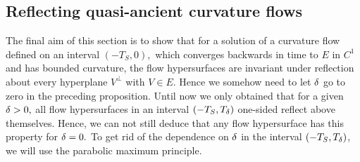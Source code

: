 \documentclass{amsart}
\begin{document}
\subsection{Reflecting quasi-ancient curvature flows}
The final aim of this section is to show that for a solution of a curvature flow defined on an interval $(-T_{S},0),$ which converges backwards in time to $E$ in $C^{1}$ and has bounded curvature, the flow hypersurfaces are invariant under reflection about every hyperplane $V^{\perp}$ with $V\in E.$ Hence we somehow need to let $\delta$ go to zero in the preceding proposition. Until now we only obtained that for a given $\delta>0,$ all flow hypersurfaces in an interval $(-T_{S},T_{\delta})$ one-sided reflect above themselves. Hence, we can not still deduce that any flow hypersurface has this property for $\delta=0.$ To get rid of the dependence on $\delta$ in the interval $(-T_{S},T_{\delta})$, we will use the parabolic maximum principle.
\end{document}
